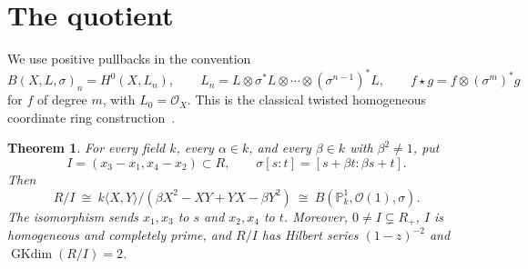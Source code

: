 \documentclass[11pt]{article}
\newtheorem{theorem}{Theorem}
\newcommand{\PP}{\mathbb P}
\newcommand{\OO}{\mathcal O}
\newcommand{\GK}{\operatorname{GKdim}}
\begin{document}
\section{The quotient}
We use positive pullbacks in the convention
\[
 B(X,L,\sigma)_n=H^0(X,L_n),\qquad
 L_n=L\otimes\sigma^*L\otimes\cdots\otimes(\sigma^{n-1})^*L,
 \qquad f\star g=f\otimes(\sigma^m)^*g
\]
for \(f\) of degree \(m\), with \(L_0=\OO_X\). This is the classical
twisted homogeneous coordinate ring construction~\cite{AV, RZ}.

\begin{theorem}
For every field \(k\), every \(\alpha\in k\), and every \(\beta\in k\)
with \(\beta^2\ne1\), put
\[
 I=(x_3-x_1,x_4-x_2)\subset R,\qquad
 \sigma[s:t]=[s+\beta t:\beta s+t].
\]
Then
\[
 R/I\ \cong\
 k\langle X,Y\rangle/(\beta X^2-XY+YX-\beta Y^2)
 \ \cong\ B(\PP^1_k,\OO(1),\sigma).
\]
The isomorphism sends \(x_1,x_3\) to \(s\) and \(x_2,x_4\) to \(t\).
Moreover, \(0\ne I\subsetneq R_+\), \(I\) is homogeneous and completely
prime, and \(R/I\) has Hilbert series \((1-z)^{-2}\) and
\(\GK(R/I)=2\).
\end{theorem}
\end{document}
